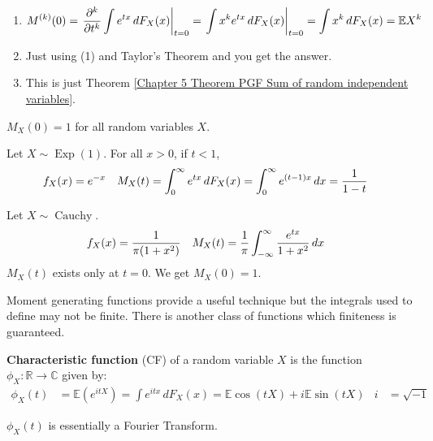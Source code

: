 \documentclass{huhtakm-template-book}
\newcommand{\expect}{\mathbb{E}}
\DeclareMathOperator{\Exp}{Exp}
\DeclareMathOperator{\Cauchy}{Cauchy}
\begin{document}
    \begin{proofing}
        \begin{enumerate}
            \item 
            \begin{equation*}
                M^{(k)}(0)=\left.\pdv*[order={k}]{\int e^{tx}\,dF_{X}(x)}{t}\right|_{t=0}=\left.\int x^{k}e^{tx}\,dF_{X}(x)\right|_{t=0}=\int x^{k}\,dF_{X}(x)=\expect X^{k}
            \end{equation*}
            \item Just using (1) and Taylor's Theorem and you get the answer.
            \item This is just Theorem \ref{Chapter 5 Theorem PGF Sum of random independent variables}.
        \end{enumerate}
    \end{proofing}
    \begin{rem}
        $M_{X}(0)=1$ for all random variables $X$.
    \end{rem}
    \begin{eg}
        Let $X\sim\Exp(1)$. For all $x>0$, if $t<1$,
        \begin{align*}
            f_{X}(x)&=e^{-x} & M_{X}(t)&=\int_{0}^{\infty}e^{tx}\,dF_{X}(x)=\int_{0}^{\infty}e^{(t-1)x}\,dx=\frac{1}{1-t}
        \end{align*}
    \end{eg}
    \begin{eg}
        Let $X\sim\Cauchy$.
        \begin{align*}
            f_{X}(x)&=\frac{1}{\pi(1+x^{2})} & M_{X}(t)&=\frac{1}{\pi}\int_{-\infty}^{\infty}\frac{e^{tx}}{1+x^{2}}\,dx
        \end{align*}
        $M_{X}(t)$ exists only at $t=0$. We get $M_{X}(0)=1$.
    \end{eg}
    \newpage
    Moment generating functions provide a useful technique but the integrals used to define may not be finite. There is another class of functions which finiteness is guaranteed.
    \begin{defn}
        \textbf{Characteristic function} (CF) of a random variable $X$ is the function $\phi_{X}:\mathbb{R}\to\mathbb{C}$ given by:
        \begin{align*}
            \phi_{X}(t)&=\expect(e^{itX})=\int e^{itx}\,dF_{X}(x)=\expect\cos(tX)+i\expect\sin(tX) & i&=\sqrt{-1}
        \end{align*}
    \end{defn}
    \begin{rem}
        $\phi_{X}(t)$ is essentially a Fourier Transform.
    \end{rem}
\end{document}
